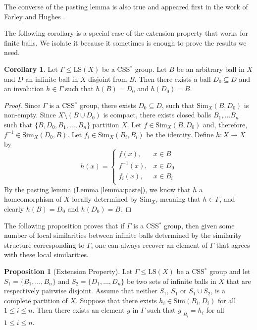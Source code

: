 \documentclass[12pt]{amsart}
\numberwithin{equation}{subsection}
\theoremstyle{definition}
\newtheorem{corollary}[theorem]{Corollary}
\newtheorem{proposition}[theorem]{Proposition}
\theoremstyle{definition}
\theoremstyle{remark}
\newcommand{\Sim}{\text{Sim}}
\begin{document}
The converse of the pasting lemma is also true and appeared first in the work of Farley and Hughes \cite[Proposition 3.11]{hughes2017braided}.


The following corollary is a special case of the extension property that works for finite balls. We isolate it because it sometimes is enough to prove the results we need. 



\begin{corollary}\label{cor:extension}
Let $\Gamma \leq \text{LS}(X)$ be a CSS$^*$ group. Let $B$ be an arbitrary ball in $X$ and $D$ an infinite ball in $X$ disjoint from $B$. Then there exists a ball $D_0 \subseteq D$  and an involution $h \in \Gamma $ such that $h(B) = D_0$ and $h(D_0) = B$. 
\end{corollary}

\begin{proof}
Since $\Gamma$ is a CSS$^*$ group, there exists $D_0 \subseteq D$, such that $\text{Sim}_{X}(B,D_0)$ is non-empty. Since $X \setminus (B \cup D_0)$ is compact, there exists closed balls $B_1, \dots B_n$ such that $\{B,D_0,B_1, \dots , B_n \}$ partition $X$. Let $f \in \text{Sim}_{X}(B,D_0)$ and, therefore, $f^{-1} \in \text{Sim}_{X}(D_0,B)$. Let $f_i \in \text{Sim}_{X}(B_i,B_i)$ be the identity. Define $h: X \to X$ by 
$$h(x) = 
\begin{cases}
f(x), & x \in B \\
f^{-1}(x), & x \in D_0 \\
f_i(x), & x \in B_i \\
\end{cases}
$$
By the pasting lemma (Lemma \ref{lemma:paste}), we know that $h$ a homeomorphism of $X$ locally determined by $\Sim_{X}$, meaning that $h \in \Gamma$, and clearly $h(B) = D_0$ and $h(D_0) = B$. 
\end{proof}


The following proposition proves that if $\Gamma$ is a CSS$^*$ group, then given some number of local similarities between infinite balls determined by the similarity structure corresponding to $\Gamma$, one can always recover an element of $\Gamma$ that agrees with these local similarities. 


\begin{proposition}[Extension Property]\label{prop:extension}
    Let $\Gamma \leq \text{LS}(X)$ be a CSS$^*$ group and let $S_1 =\{B_1, \dots , B_n\}$ and $S_2 = \{D_1, \dots , D_n\}$ be two sets of infinite balls in $X$ that are respectively pairwise disjoint. Assume that neither $S_1$, $S_1$ or $S_1 \cup S_2$, is a complete partition of $X$. Suppose that there exists $h_i \in \text{Sim}(B_i,D_i)$ for all $1 \leq i \leq n$. Then there exists an element $g$ in $\Gamma$ such that $g\vert_{B_i} = h_i$ for all $1 \leq i \leq n$.
\end{proposition}
\end{document}
